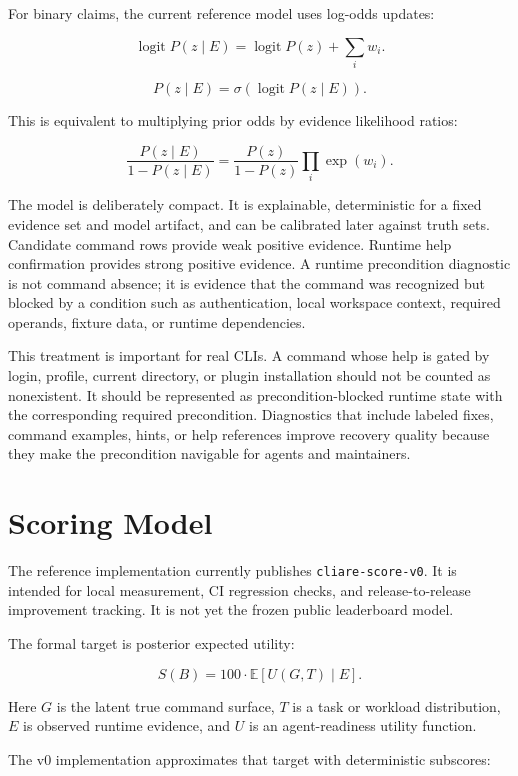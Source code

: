 \documentclass[11pt]{article}
\begin{document}
For binary claims, the current reference model uses log-odds updates:

\[
\operatorname{logit} P(z \mid E)
  = \operatorname{logit} P(z) + \sum_i w_i .
\]

\[
P(z \mid E)
  = \sigma\!\left(\operatorname{logit} P(z \mid E)\right).
\]

This is equivalent to multiplying prior odds by evidence likelihood ratios:

\[
\frac{P(z \mid E)}{1 - P(z \mid E)}
  =
  \frac{P(z)}{1 - P(z)}
  \prod_i \exp(w_i).
\]

The model is deliberately compact. It is explainable, deterministic for a fixed evidence set and model artifact, and can be calibrated later against truth sets. Candidate command rows provide weak positive evidence. Runtime help confirmation provides strong positive evidence. A runtime precondition diagnostic is not command absence; it is evidence that the command was recognized but blocked by a condition such as authentication, local workspace context, required operands, fixture data, or runtime dependencies.

This treatment is important for real CLIs. A command whose help is gated by login, profile, current directory, or plugin installation should not be counted as nonexistent. It should be represented as precondition-blocked runtime state with the corresponding required precondition. Diagnostics that include labeled fixes, command examples, hints, or help references improve recovery quality because they make the precondition navigable for agents and maintainers.

\section{Scoring Model}

The reference implementation currently publishes \texttt{cliare-score-v0}. It is intended for local measurement, CI regression checks, and release-to-release improvement tracking. It is not yet the frozen public leaderboard model.

The formal target is posterior expected utility:

\[
S(B) = 100 \cdot \mathbb{E}[U(G, T) \mid E].
\]

Here \(G\) is the latent true command surface, \(T\) is a task or workload distribution, \(E\) is observed runtime evidence, and \(U\) is an agent-readiness utility function.

The v0 implementation approximates that target with deterministic subscores:
\end{document}
